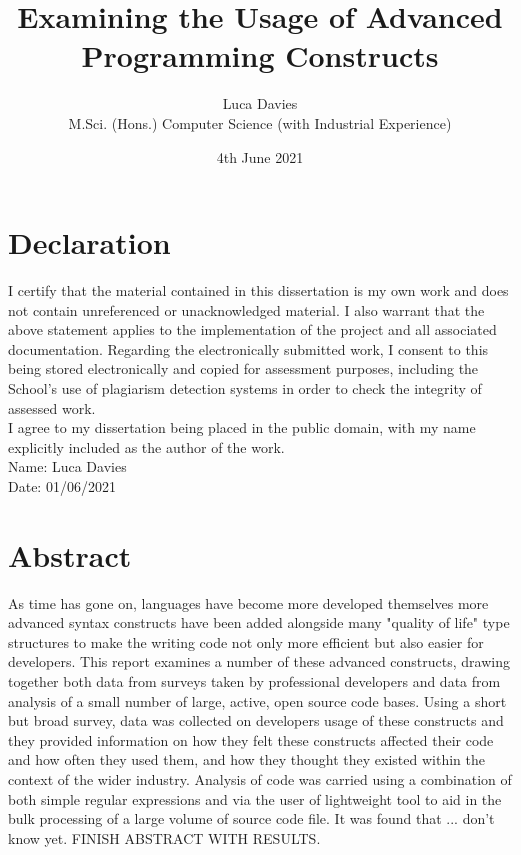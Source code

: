 \documentclass{article}
\title{\textbf{Examining the Usage of Advanced Programming Constructs}}
\author{
Luca Davies \\ M.Sci. (Hons.) Computer Science (with Industrial Experience)}
\date{4th June 2021}
\begin{document}
\maketitle

\newpage
\section*{Declaration}
    I certify that the material contained in this dissertation is my own work and does not contain unreferenced or unacknowledged material. I also warrant that the above statement applies to the implementation of the project and all associated documentation. Regarding the electronically submitted work, I consent to this being stored electronically and copied for assessment purposes, including the School’s use of plagiarism detection systems in order to check the integrity of assessed work. \\
    I agree to my dissertation being placed in the public domain, with my name explicitly included as the author of the work. \\
    
    \noindent
    Name: Luca Davies\\
    Date: 01/06/2021
\newpage
\section*{Abstract}
    As time has gone on, languages have become more developed themselves more advanced syntax constructs have been added alongside many "quality of life" type structures to make the writing code not only more efficient but also easier for developers. This report examines a number of these advanced constructs, drawing together both data from surveys taken by professional developers and data from analysis of a small number of large, active, open source code bases. Using a short but broad survey, data was collected on developers usage of these constructs and they provided information on how they felt these constructs affected their code and how often they used them, and how they thought they existed within the context of the wider industry. Analysis of code was carried using a combination of both simple regular expressions and via the user of lightweight tool to aid in the bulk processing of a large volume of source code file. It was found that ... don't know yet. FINISH ABSTRACT WITH RESULTS.
    \newline
\newpage
\tableofcontents
\newpage
\end{document}

